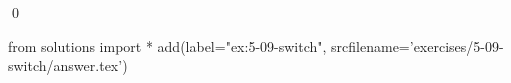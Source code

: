 
\begin{ex}
  \label{ex:5-09-switch}
  
  \qed
\end{ex}
\begin{python0}
from solutions import *
add(label="ex:5-09-switch",
    srcfilename='exercises/5-09-switch/answer.tex')
\end{python0}
